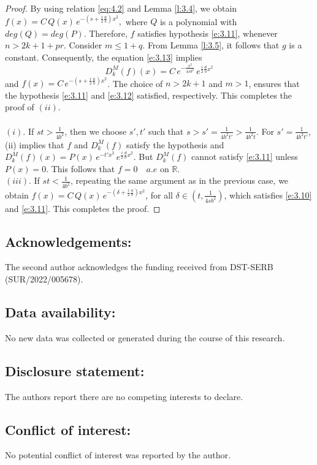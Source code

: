 \documentclass[12pt,a4paper,reqno]{amsproc}
\theoremstyle{definition}
\theoremstyle{remark}
\numberwithin{equation}{section}
\begin{document}
\begin{proof}
 By using relation  \eqref{eq:4.2} and Lemma \ref{l:3.4}, we obtain 
$f(x) = C\,Q(x)\, e^{-(s+\frac{i}{2}\frac{a}{b})x^2},$ 
where $Q$ is a polynomial with $deg(Q)=deg(P)$. Therefore, $f$ satisfies hypothesis \eqref{e:3.11}, whenever $n>2k+1+pr$. Consider  $m\le 1+q$. From Lemma \ref{l:3.5}, it follows that $g$ is a constant. Consequently, the equation \eqref{e:3.13} implies $$D_k^M(f)(x) = C\,e^{-\frac{x^2}{4sb^2}}\, e^{\frac{i}{2}\frac{d}{b}x^2}$$ and $f(x)= C\, e^{-(s+\frac{i}{2}\frac{a}{b})x^2}$. The choice of $n>2k+1$ and $m>1$, ensures that the hypothesis \eqref{e:3.11} and \eqref{e:3.12} satisfied, respectively. This completes the proof of $(ii)$.\\\\ $(i).$ If $st>\frac{1}{4b^2}$, then we choose $s', t'$ such that $s> s'=\frac{1}{4b^2t'}>\frac{1}{4b^2t}$. For $s'=\frac{1}{4b^2t'}$, (ii) implies that $f$ and $D_k^M(f)$  satisfy the hypothesis and $D_k^M(f)(x)= P(x)\,e^{-t'x^2}\, e^{\frac{i}{2}\frac{d}{b}x^2}$. But $D_k^M(f)$ cannot satisfy \eqref{e:3.11} unless $P(x)=0$. This follows that $f=0 \quad a.e$ on $\mathbb{R}$. \\
$(iii).$ If $st< \frac{1}{4b^2}$, repeating the same argument as in the previous case, we obtain $f(x) =  C\,Q(x)\, e^{-(\delta+\frac{i}{2}\frac{a}{b})x^2}$, for all $\delta \in (t, \frac{1}{4sb^2})$, which satisfies  \eqref{e:3.10} and \eqref{e:3.11}. This completes the proof.
\end{proof}
\subsection*{Acknowledgements:} The second author acknowledges the funding received from DST-SERB (SUR/2022/005678).
\subsection*{Data availability:} No new data was collected or generated during the course of this research.
\subsection*{Disclosure statement:} The authors report there are no competing interests to declare.  

\subsection*{Conflict of interest:} No potential conflict of interest was reported by the author.
\end{document}
